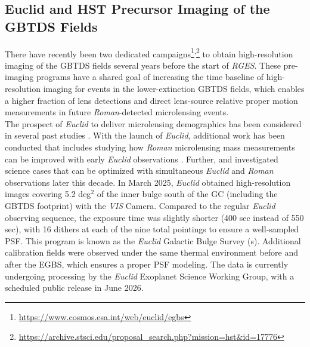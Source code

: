 \documentclass[twocolumn]{aastex631}
\begin{document}
\subsection{Euclid and HST Precursor Imaging of the GBTDS Fields}
There have recently been two dedicated campaigns\footnote{\url{https://www.cosmos.esa.int/web/euclid/egbs}}\textsuperscript{,}\footnote{\url{https://archive.stsci.edu/proposal_search.php?mission=hst&id=17776}} to obtain high-resolution imaging of the GBTDS fields several years before the start of \textit{RGES}. These pre-imaging programs have a shared goal of increasing the time baseline of high-resolution imaging for events in the lower-extinction GBTDS fields, which enables a higher fraction of lens detections and direct lens-source relative proper motion measurements in future \textit{Roman}-detected microlensing events.\\
\indent The prospect of \textit{Euclid} to deliver microlensing demographics has been considered in several past studies \citep{beaulieu:2010a, penny:2013a}. With the launch of \textit{Euclid}, additional work has been conducted that includes studying how \textit{Roman} microlensing mass measurements can be improved with early \textit{Euclid} observations \citep{bachelet:2022a}. Further, \cite{bachelet:2019a} and \cite{beaulieu:2021a} investigated science cases that can be optimized with simultaneous \textit{Euclid} and \textit{Roman} observations later this decade. In March 2025, \textit{Euclid} obtained high-resolution images covering 5.2 deg$^2$ of the inner bulge south of the GC (including the GBTDS footprint) with the \textit{VIS} Camera. Compared to the regular \textit{Euclid} observing sequence, the exposure time was slightly shorter (400 sec instead of 550 sec), with 16 dithers at each of the nine total pointings to ensure a well-sampled PSF. This program is known as the \textit{Euclid} Galactic Bulge Survey (s). Additional calibration fields were observed under the same thermal environment before and after the EGBS, which ensures a proper PSF modeling. The data is currently undergoing processing by the \textit{Euclid} Exoplanet Science Working Group, with a scheduled public release in June 2026. \\
\end{document}
